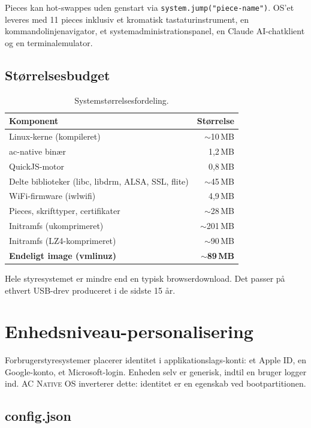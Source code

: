 \documentclass[10pt,letterpaper,twocolumn]{article}
\newcommand{\acos}{\textsc{AC Native OS}}
\begin{document}
Pieces kan hot-swappes uden genstart via \texttt{system.jump("piece-name")}. OS'et leveres med 11 pieces inklusiv et kromatisk tastaturinstrument, en kommandolinjenavigator, et systemadministrationspanel, en Claude AI-chatklient og en terminalemulator.

\subsection{Størrelsesbudget}

\begin{table}[h]
\small\centering
\begin{tabular}{lr}
\toprule
\textbf{Komponent} & \textbf{Størrelse} \\
\midrule
Linux-kerne (kompileret) & $\sim$10\,MB \\
ac-native binær & 1,2\,MB \\
QuickJS-motor & 0,8\,MB \\
Delte biblioteker (libc, libdrm, ALSA, SSL, flite) & $\sim$45\,MB \\
WiFi-firmware (iwlwifi) & 4,9\,MB \\
Pieces, skrifttyper, certifikater & $\sim$28\,MB \\
\midrule
Initramfs (ukomprimeret) & $\sim$201\,MB \\
Initramfs (LZ4-komprimeret) & $\sim$90\,MB \\
\textbf{Endeligt image (vmlinuz)} & \textbf{$\sim$89\,MB} \\
\bottomrule
\end{tabular}
\caption{Systemstørrelsesfordeling.}
\label{tab:size}
\end{table}

Hele styresystemet er mindre end en typisk browserdownload. Det passer på ethvert USB-drev produceret i de sidste 15 år.

\section{Enhedsniveau-personalisering}
\label{sec:personalization}

Forbrugerstyresystemer placerer identitet i applikationslags-konti: et Apple ID, en Google-konto, et Microsoft-login. Enheden selv er generisk, indtil en bruger logger ind. \acos{} inverterer dette: identitet er en egenskab ved bootpartitionen.

\subsection{config.json}
\end{document}
